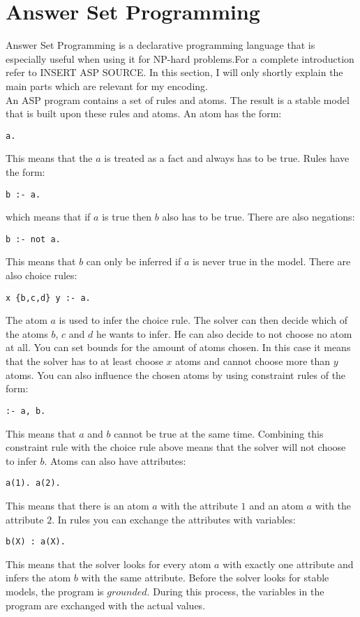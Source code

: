 \documentclass[runningheads]{llncs}
\begin{document}
\section{Answer Set Programming}
Answer Set Programming is a declarative programming language that is especially useful when using it for NP-hard problems.For a complete introduction refer to INSERT ASP SOURCE. In this section, I will only shortly explain the main parts which are relevant for my encoding. \\
An ASP program contains a set of rules and atoms. The result is a stable model that is built upon these rules and atoms. An atom has the form: 
\begin{verbatim}
a.
\end{verbatim}
This means that the $a$ is treated as a fact and always has to be true. Rules have the form:
\begin{verbatim}
b :- a.
\end{verbatim}
which means that if $a$ is true then $b$ also has to be true. There are also negations:
\begin{verbatim}
b :- not a.
\end{verbatim}
This means that $b$ can only be inferred if $a$ is never true in the model. There are also choice rules:
\begin{verbatim}
x {b,c,d} y :- a.
\end{verbatim}
The atom $a$ is used to infer the choice rule. The solver can then decide which of the atoms $b$, $c$ and $d$ he wants to infer. He can also decide to not choose no atom at all. You can set bounds for the amount of atoms chosen. In this case it means that the solver has to at least choose $x$ atoms and cannot choose more than $y$ atoms. You can also influence the chosen atoms by using constraint rules of the form:
\begin{verbatim}
:- a, b.
\end{verbatim}
This means that $a$ and $b$ cannot be true at the same time. Combining this constraint rule with the choice rule above means that the solver will not choose to infer $b$. Atoms can also have attributes:
\begin{verbatim}
a(1). a(2).
\end{verbatim}
This means that there is an atom $a$ with the attribute $1$ and an atom $a$ with the attribute $2$. In rules you can exchange the attributes with variables:
\begin{verbatim}
b(X) : a(X).
\end{verbatim}
This means that the solver looks for every atom $a$ with exactly one attribute and infers the atom $b$ with the same attribute. Before the solver looks for stable models, the program is $grounded$. During this process, the variables in the program are exchanged with the actual values. \\
\end{document}
